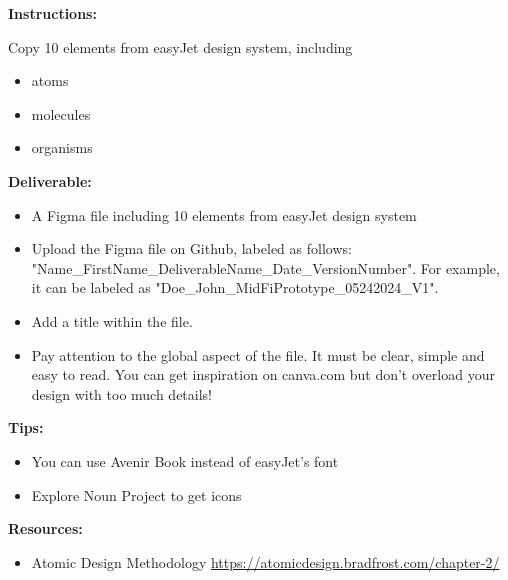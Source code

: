 \makeheaderfiles

\textbf{Instructions:}

Copy 10 elements from easyJet design system, including

\begin{itemize}
\item atoms
\item molecules
\item organisms
\end{itemize}

\textbf{Deliverable:}

\begin{itemize}
\item A Figma file including 10 elements from easyJet design system
\item Upload the Figma file on Github, labeled as follows: "Name\_FirstName\_DeliverableName\_Date\_VersionNumber". For example, it can be labeled as "Doe\_John\_MidFiPrototype\_05242024\_V1".
\item Add a title within the file.
\item Pay attention to the global aspect of the file. It must be clear, simple and easy to read. You can get inspiration on canva.com but don't overload your design with too much details!
\end{itemize}

\textbf{Tips:}

\begin{itemize}
\item You can use Avenir Book instead of easyJet's font
\item Explore Noun Project to get icons
\end{itemize}

\textbf{Resources:}

\begin{itemize}
\item Atomic Design Methodology \url{https://atomicdesign.bradfrost.com/chapter-2/} 
\end{itemize}

